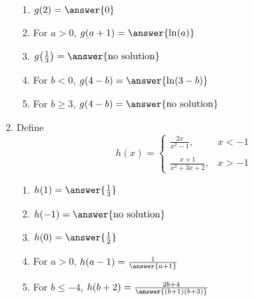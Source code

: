 \documentclass{ximera}
\begin{document}
\begin{exercise}
\begin{enumerate}
\begin{enumerate}
\item $g(2) = \answer{0}$

\item For $a>0$, $g(a+1) = \answer{\ln(a)}$

\item $g\!\left(\frac{1}{3}\right) = \answer{\text{no solution}}$


\item For $b<0$, $g(4-b) = \answer{\ln(3-b)}$

\item For $b\ge 3$, $g(4-b) = \answer{\text{no solution}}$
\end{enumerate}

\item Define \begin{equation*}
	h(x) = \begin{cases}
		\frac{2x}{x^2-1},  & x < -1 \\
		\\
		\frac{x+1}{x^2+3x+2},  & x> -1 
		\end{cases}
		\end{equation*}
	\begin{enumerate}
	\item $h(1) = \answer{\frac{1}{3}}$
	
	\item $h(-1) = \answer{\text{no solution}}$
	
	\item $h(0) = \answer{\frac{1}{2}}$
	
	\item For $a>0$, $h(a-1) = \frac{1}{\answer{a+1}}$
	
	\item For $b \leq -4$, $h(b+2) =\frac{2b + 4}{\answer{(b+ 1)(b+3)}}$
	\end{enumerate}
\end{enumerate}

\end{exercise}
\end{document}
